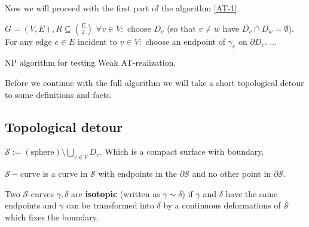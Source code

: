 Now we will proceed with the first part of the algorithm \ref{AT-1}.

\begin{algorithm}[!ht]
	\begin{algorithmic}[1]
		\Require $G = (V,E), R \subseteq \binom{E}{2}$
		\State $\forall v \in V:$ choose $D_v$ (so that $v \neq w$ have $\overline{D_v} \cap \overline{D_w} = \emptyset$).
		\State For any edge $e \in E$ incident to $v \in V:$ choose an endpoint of $\gamma_e$ on $\partial D_v$.
		\State \textcolor{Green}{$\dots$}
	\end{algorithmic}
	\caption{NP algorithm for testing Weak AT-realization.}
	\label{AT-1}
\end{algorithm}

Before we continue with the full algorithm we will take a short topological detour to some definitions and facts.

\subsection{Topological detour}

\begin{defn}
	$\mathcal{S} := (\text{sphere}) \setminus \bigcup_{v \in V} D_v$. Which is a compact surface with boundary.
\end{defn}

\begin{defn}
	$\mathcal{S}-\text{curve}$ is a curve in $\mathcal{S}$ with endpoints in the $\partial \mathcal{S}$ and no other point in $\partial \mathcal{S}$.
\end{defn}

\begin{defn}
	Two $\mathcal{S}$-curves $\gamma, \delta$ are \textbf{isotopic} (written as $\gamma \sim \delta$) if $\gamma$ and $\delta$ have the same endpoints and $\gamma$ can be transformed into $\delta$ by a continuous deformations of $\mathcal{S}$ which fixes the boundary.
\end{defn}

